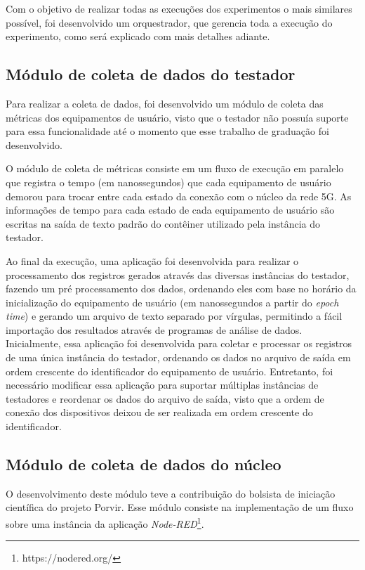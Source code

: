 Com o objetivo de realizar todas as execuções dos experimentos o mais similares possível, foi desenvolvido um orquestrador, que gerencia toda a execução do experimento, como será explicado com mais detalhes adiante.

\subsection{Módulo de coleta de dados do testador}

Para realizar a coleta de dados, foi desenvolvido um módulo de coleta das métricas dos equipamentos de usuário, visto que o testador não possuía suporte para essa funcionalidade até o momento que esse trabalho de graduação foi desenvolvido.

O módulo de coleta de métricas consiste em um fluxo de execução em paralelo que registra o tempo (em nanossegundos) que cada equipamento de usuário demorou para trocar entre cada estado da conexão com o núcleo da rede 5G.
As informações de tempo para cada estado de cada equipamento de usuário são escritas na saída de texto padrão do contêiner utilizado pela instância do testador.

Ao final da execução, uma aplicação foi desenvolvida para realizar o processamento dos registros gerados através das diversas instâncias do testador, fazendo um pré processamento dos dados, ordenando eles com base no horário da inicialização do equipamento de usuário (em nanossegundos a partir do \textit{epoch time}) e gerando um arquivo de texto separado por vírgulas, permitindo a fácil importação dos resultados através de programas de análise de dados.
Inicialmente, essa aplicação foi desenvolvida para coletar e processar os registros de uma única instância do testador, ordenando os dados no arquivo de saída em ordem crescente do identificador do equipamento de usuário. Entretanto, foi necessário modificar essa aplicação para suportar múltiplas instâncias de testadores e reordenar os dados do arquivo de saída, visto que a ordem de conexão dos dispositivos deixou de ser realizada em ordem crescente do identificador.

\subsection{Módulo de coleta de dados do núcleo}

O desenvolvimento deste módulo teve a contribuição do bolsista de iniciação científica do projeto Porvir.
Esse módulo consiste na implementação de um fluxo sobre uma instância da aplicação \textit{Node-RED}\footnote{https://nodered.org/}.

